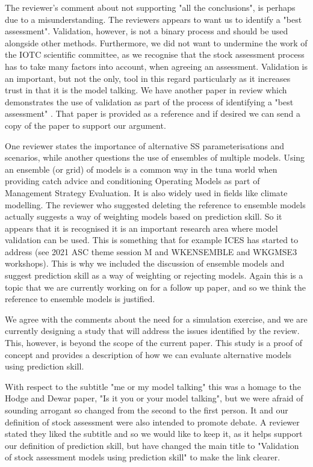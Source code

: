 The reviewer's comment about not supporting "all the conclusions", is perhaps due to a misunderstanding. The reviewers appears to want us to identify a "best assessment". Validation, however, is not a binary process and should be used alongside other methods. Furthermore, we did not want to undermine the work of the IOTC scientific committee, as we recognise that the stock assessment process has to take many factors into account, when agreeing an assessment. Validation is an important, but not the only, tool in this regard particularly as it increases trust in that it is the model talking. We have another paper in review which demonstrates the use of validation as part of the process of identifying a "best assessment" \cite{carvalho2020cookbook}. That paper is provided as a reference and if desired we can send a copy of the paper to support our argument. 

One reviewer states the importance of alternative SS parameterisations and scenarios, while another questions the use of ensembles of multiple models. Using an ensemble (or grid) of models is a common way in the tuna world when providing catch advice and conditioning Operating Models as part of Management Strategy Evaluation. It is also widely used in fields like climate modelling. The reviewer who suggested deleting the reference to ensemble models actually suggests a way of weighting models based on prediction skill. So it appears that it is recognised it is an important research area where model validation can be used. This is something that for example ICES has started to address (see 2021 ASC theme  session M and WKENSEMBLE and WKGMSE3 workshops). This is why we included the discussion of ensemble models and suggest prediction skill as a way of weighting or rejecting models. Again this is a topic that we are currently working on for a follow up paper, and so we think the reference to ensemble models is justified.

We agree with the comments about the need for a simulation exercise, and we are currently designing a study that will address the issues identified by the review. This, however, is beyond the scope of the current paper. This study is a proof of concept and provides a description of how we can evaluate alternative models using prediction skill.

With respect to the subtitle "me or my model talking" this was a homage to the Hodge and Dewar paper, "Is it you or your model talking", but we were afraid of sounding arrogant so changed from the second to the first person. It and our definition of stock assessment were also intended to promote debate. A reviewer stated they liked the subtitle and so we would like to keep it, as it helps support our definition of prediction skill, but have changed the main title to "Validation of stock assessment models using prediction skill" to make the link clearer.
\newpage

